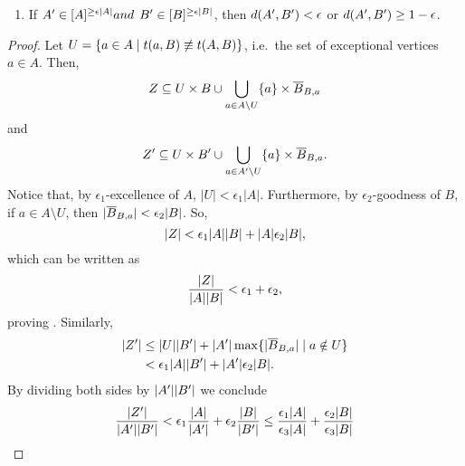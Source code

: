 \begin{lemma}
\begin{enumerate}[label=\alph*., ref=\alph*]
                \item \label{itm:excellence_implies_regularity.b} If $A' \in [ A ]^{\geq \epsilon | A |} and $
                    $B' \in [ B ]^{\geq \epsilon | B |}$, then $d ( A',B' ) < \epsilon$ or
                    $d ( A',B' ) \geq 1 - \epsilon$.
            \end{enumerate}
            \begin{proof}
                Let $U = \{ a \in A \mid t(a,B) \not\equiv t(A,B) \}$, i.e.~the set
                of exceptional vertices $a \in A$.
                Then,
                \[
                    Z \subseteq U \times B \cup \bigcup_{a \in A \setminus U} \{ a \} \times \overline{B}_{B,a}
                \]
                and
                \[
                    Z' \subseteq U \times B' \cup \bigcup_{a \in A' \setminus U} \{ a \} \times \overline{B}_{B,a}.
                \]
                Notice that, by $\epsilon_1$-excellence of $A$, $|U| < \epsilon_1 |A|$.
                Furthermore, by $\epsilon_2$-goodness of $B$,
                if $a \in A \setminus U$, then $| \overline{B}_{B,a} | < \epsilon_2 | B |$.
                So,
                \[
                    | Z | < \epsilon_1 | A | | B | + | A | \epsilon_2 | B |,
                \]
                which can be written as
                \[
                        \frac{| Z |}{| A | | B |} < \epsilon_1 + \epsilon_2,
                \]
                proving .
                Similarly,
                \begin{align*}
                    | Z' | & \leq | U | | B' | + | A' | \max \{ | \overline{B}_{B,a} | \mid a \notin U \} \\
                                     & < \epsilon_1 | A | | B' | + | A' | \epsilon_2 | B |.
                \end{align*}
                By dividing both sides by $| A' | | B' |$ we conclude
                \[
                    \frac{| Z' |}{| A' | | B' |} < \epsilon_1 \frac{| A |}{| A' |} + \epsilon_2 \frac{| B |}{| B' |}
                    \leq \frac{\epsilon_1 | A |}{\epsilon_3 | A |} + \frac{\epsilon_2 | B |} {\epsilon_3 | B |}
\]
\end{proof}
\end{lemma}
